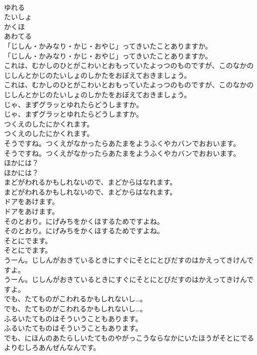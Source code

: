 \documentclass[8pt]{extreport}
\begin{document}
\begin{CJK}{UTF8}{min}
\\	ゆれる
\\	たいしょ
\\	かくほ
\\	あわてる
\\	「じしん・かみなり・かじ・おやじ」ってきいたことありますか。
\\	「じしん・かみなり・かじ・おやじ」ってきいたことありますか。
\\	これは、むかしのひとがこわいとおもっていたよっつのものですが、このなかのじしんとかじのたいしょのしかたをおぼえておきましょう。
\\	これは、むかしのひとがこわいとおもっていたよっつのものですが、このなかのじしんとかじのたいしょのしかたをおぼえておきましょう。
\\	じゃ、まずグラッとゆれたらどうしますか。
\\	じゃ、まずグラッとゆれたらどうしますか。
\\	つくえのしたにかくれます。
\\	つくえのしたにかくれます。
\\	そうですね。つくえがなかったらあたまをようふくやカバンでおおいます。
\\	そうですね。つくえがなかったらあたまをようふくやカバンでおおいます。
\\	ほかには？
\\	ほかには？
\\	まどがわれるかもしれないので、まどからはなれます。
\\	まどがわれるかもしれないので、まどからはなれます。
\\	ドアをあけます。
\\	ドアをあけます。
\\	そのとおり。にげみちをかくほするためですよね。
\\	そのとおり。にげみちをかくほするためですよね。
\\	そとにでます。
\\	そとにでます。
\\	うーん。じしんがおきているときにすぐにそとにとびだすのはかえってきけんですよ。
\\	うーん。じしんがおきているときにすぐにそとにとびだすのはかえってきけんですよ。
\\	でも、たてものがこわれるかもしれないし…。
\\	でも、たてものがこわれるかもしれないし…。
\\	ふるいたてものはそういうこともあります。
\\	ふるいたてものはそういうこともあります。
\\	でも、にほんのあたらしいたてものやがっこうならなかにいたほうがそとにでるよりむしろあんぜんなんです。

\end{CJK}
\end{document}
